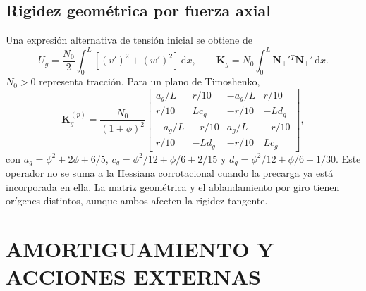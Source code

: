 \documentclass[oneside,a4paper,spanish,links,pagenumbers]{amca}
\newcommand{\dd}{\mathrm{d}}
\begin{document}
\subsection{Rigidez geométrica por fuerza axial}
Una expresión alternativa de tensión inicial se obtiene de
\begin{equation}
U_g=\frac{N_0}{2}\int_0^L[(v')^2+(w')^2]\,\dd x,
\qquad \bm K_g=N_0\int_0^L\bm N_{\perp}'{}^T\bm N_{\perp}'\,\dd x.
\end{equation}
$N_0>0$ representa tracción. Para un plano de Timoshenko,
\begin{equation}
\bm K_g^{(p)}=\frac{N_0}{(1+\phi)^2}
\begin{bmatrix}
a_g/L&r/10&-a_g/L&r/10\\
r/10&Lc_g&-r/10&-Ld_g\\
-a_g/L&-r/10&a_g/L&-r/10\\
r/10&-Ld_g&-r/10&Lc_g
\end{bmatrix},
\end{equation}
con $a_g=\phi^2+2\phi+6/5$, $c_g=\phi^2/12+\phi/6+2/15$ y $d_g=\phi^2/12+\phi/6+1/30$. Este operador no se suma a la Hessiana corrotacional cuando la precarga ya está incorporada en ella. La matriz geométrica y el ablandamiento por giro tienen orígenes distintos, aunque ambos afecten la rigidez tangente.



\section{AMORTIGUAMIENTO Y ACCIONES EXTERNAS}
\end{document}
